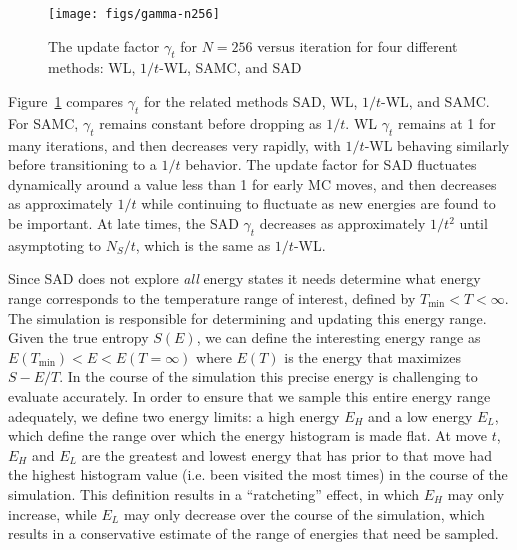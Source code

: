 \documentclass[letterpaper,twocolumn,amsmath,amssymb,pre,aps,10pt]{revtex4-1}
\begin{document}
\begin{figure}
  \texttt{[image: figs/gamma-n256]}
  \caption{The update factor $\gamma_t$ for $N=256$ versus iteration for
    four different methods: WL, $1/t$-WL, SAMC, and SAD}
    \label{fig:gamma-vs-t}
\end{figure}
Figure~\ref{fig:gamma-vs-t} compares $\gamma_t$ for the related methods
SAD, WL, $1/t$-WL, and SAMC.  For SAMC, $\gamma_t$ remains constant
before dropping as $1/t$.  WL $\gamma_t$ remains at 1 for many iterations,
and then decreases very rapidly, with $1/t$-WL behaving similarly before
transitioning to a $1/t$ behavior.
The update factor for SAD fluctuates
dynamically around a value less than 1 for early MC moves, and then
decreases as approximately $1/t$ while continuing to fluctuate as 
new energies are found to be important.  At late times, the SAD $\gamma_t$
decreases as approximately $1/t^2$ until asymptoting to $N_S/t$, which
is the same as $1/t$-WL.

Since SAD does not explore \emph{all} energy states it needs determine
what energy range corresponds to the temperature range of interest,
defined by $T_{\min}<T<\infty$.
The
simulation is responsible for determining and updating this energy
range.
Given the true entropy $S(E)$, we can define the interesting energy
range as
  $E(T_{\min}) <E< E(T=\infty)$
where $E(T)$ is the energy that maximizes $S-E/T$.  In the course of the
simulation this precise energy is challenging to evaluate accurately.
In order to ensure that we sample this entire energy range adequately,
we define two energy limits:  a high energy $E_H$ and a low
energy $E_L$, which define the range over which the energy histogram
is made flat. At move $t$, $E_H$ and $E_L$ are the greatest and lowest
energy that has prior to that move
had the highest histogram value (i.e. been visited the most times) in
the course of the simulation.
This definition results in a ``ratcheting'' effect, in which $E_H$
may only increase, while $E_L$ may only decrease over the course of the
simulation, which results in a conservative estimate of the range of
energies that need be sampled.
\end{document}
